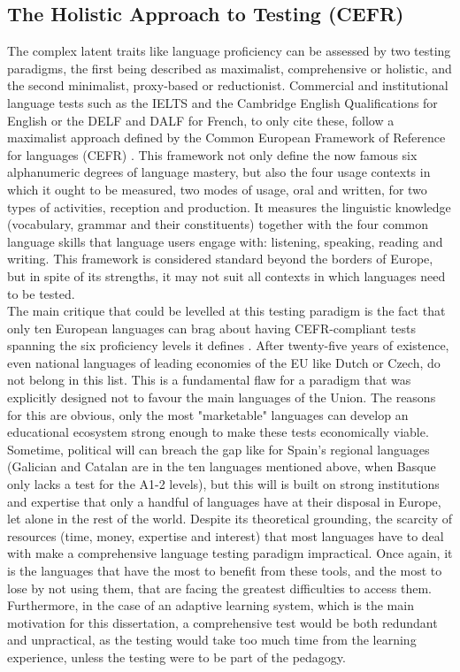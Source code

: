     \subsection{The Holistic Approach to Testing (CEFR)}
The complex latent traits like language proficiency can be assessed by two testing paradigms, the first being described as maximalist, comprehensive or holistic, and the second minimalist, proxy-based or reductionist. Commercial and institutional language tests such as the IELTS and the Cambridge English Qualifications for English or the DELF and DALF for French, to only cite these, follow a maximalist approach defined by the Common European Framework of Reference for languages (CEFR) \parencite{europe_common_2020}. This framework not only define the now famous six alphanumeric degrees of language mastery, but also the four usage contexts in which it ought to be measured, two modes of usage, oral and written, for two types of activities, reception and production. It measures the linguistic knowledge (vocabulary, grammar and their constituents) together with the four common language skills that language users engage with: listening, speaking, reading and writing. This framework is considered standard beyond the borders of Europe, but in spite of its strengths, it may not suit all contexts in which languages need to be tested.\\
The main critique that could be levelled at this testing paradigm is the fact that only ten European languages can brag about having CEFR-compliant tests spanning the six proficiency levels it defines \parencite{noauthor_common_2025, noauthor_cadre_2025}. After twenty-five years of existence, even national languages of leading economies of the EU like Dutch or Czech, do not belong in this list. This is a fundamental flaw for a paradigm that was explicitly designed not to favour the main languages of the Union. The reasons for this are obvious, only the most "marketable" languages can develop an educational ecosystem strong enough to make these tests economically viable. Sometime, political will can breach the gap like for Spain's regional languages (Galician and Catalan are in the ten languages mentioned above, when Basque only lacks a test for the A1-2 levels), but this will is built on strong institutions and expertise that only a handful of languages have at their disposal in Europe, let alone in the rest of the world. Despite its theoretical grounding, the scarcity of resources (time, money, expertise and interest) that most languages have to deal with make a comprehensive language testing paradigm impractical. Once again, it is the languages that have the most to benefit from these tools, and the most to lose by not using them, that are facing the greatest difficulties to access them. Furthermore, in the case of an adaptive learning system, which is the main motivation for this dissertation, a comprehensive test would be both redundant and unpractical, as the testing would take too much time from the learning experience, unless the testing were to be part of the pedagogy.\\
